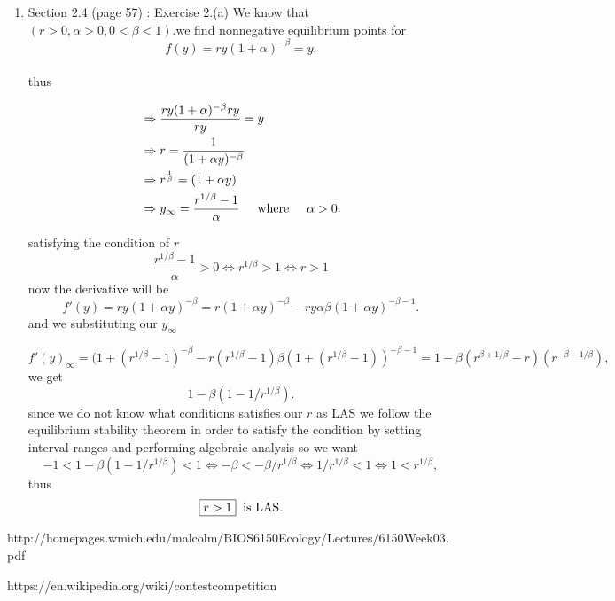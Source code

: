 \documentclass[12pt]{article}
\begin{document}
\begin{enumerate}
\item Section 2.4 (page 57) : Exercise 2.(a) We know that $(r>0,\alpha>0,0<\beta<1)$.we find nonnegative equilibrium points for 
\[f(y)=ry(1+\alpha)^{-\beta}=y.\]\\
thus

\begin{align*} 
&\Rightarrow \frac{ry(1+\alpha)^{-\beta}{ry}}{ry}=y\\
& \Rightarrow r=\frac{1}{(1+\alpha y)^{-\beta}}\\
&\Rightarrow r^\frac{1}{\beta}=(1+\alpha y)\\
&\Rightarrow y_\infty=\frac{r^{1/\beta}-1}{\alpha}\hspace{0.5cm} \mbox{where}\hspace{0.5cm} \alpha>0.
\end{align*}

satisfying the condition of $r$
\[\boxed{\frac{r^{1/\beta}-1}{\alpha}>0\Longleftrightarrow r^{1/\beta}>1\Longleftrightarrow r>1}\]
now the derivative will be
\[f'(y)=ry(1+\alpha y)^{-\beta}=r(1+\alpha y)^{-\beta}-ry\alpha\beta(1+\alpha y)^{-\beta-1}.\]
and we substituting our $y_\infty$ 

\[f'(y)_\infty=(1+(r^{1/\beta}-1)^{-\beta}-r(r^{1/\beta}-1)\beta(1+(r^{1/\beta}-1))^{-\beta-1}=1-\beta(r^{\beta+1/\beta}-r)(r^{-\beta-1/\beta}),\]
we get
\[\boxed{1-\beta(1-1/r^{1/\beta})}.\]
since we do not know what conditions satisfies our $r$ as LAS we follow the equilibrium stability theorem in order to satisfy the condition by setting interval ranges and performing algebraic analysis so we want 
\[-1<1-\beta(1-1/r^{1/\beta})<1\Longleftrightarrow-\beta<-\beta/r^{1/\beta}\Longleftrightarrow 1/r^{1/\beta}<1\Longleftrightarrow1<r^{1/\beta},\]
thus 
\[\boxed{r>1}\hspace{0.2cm} \mbox{is LAS.}\]








\cleardoublepage





\end{enumerate}



\begin{thebibliography}{99}
http://homepages.wmich.edu/malcolm/BIOS6150Ecology/Lectures/6150Week03.pdf

https://en.wikipedia.org/wiki/contestcompetition

\end{thebibliography}
\end{document}
